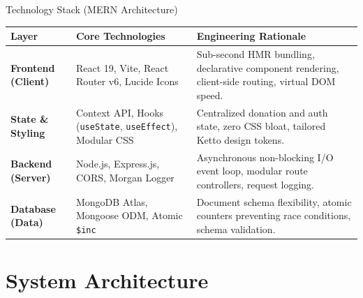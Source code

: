 \documentclass[aspectratio=169, 10pt]{beamer}
\begin{document}
\begin{frame}{Technology Stack (MERN Architecture)}
  \begin{tabularx}{\textwidth}{P{0.8} P{1.1} P{1.1}}
    \toprule
    \textbf{Layer} & \textbf{Core Technologies} & \textbf{Engineering Rationale} \\
    \midrule
    \textbf{Frontend (Client)} & React 19, Vite, React Router v6, Lucide Icons & Sub-second HMR bundling, declarative component rendering, client-side routing, virtual DOM speed. \\
    \addlinespace
    \textbf{State \& Styling} & Context API, Hooks (\texttt{useState}, \texttt{useEffect}), Modular CSS & Centralized donation and auth state, zero CSS bloat, tailored Ketto design tokens. \\
    \addlinespace
    \textbf{Backend (Server)} & Node.js, Express.js, CORS, Morgan Logger & Asynchronous non-blocking I/O event loop, modular route controllers, request logging. \\
    \addlinespace
    \textbf{Database (Data)} & MongoDB Atlas, Mongoose ODM, Atomic \texttt{\$inc} & Document schema flexibility, atomic counters preventing race conditions, schema validation. \\
    \bottomrule
  \end{tabularx}
\end{frame}

\section{System Architecture}
\end{document}
